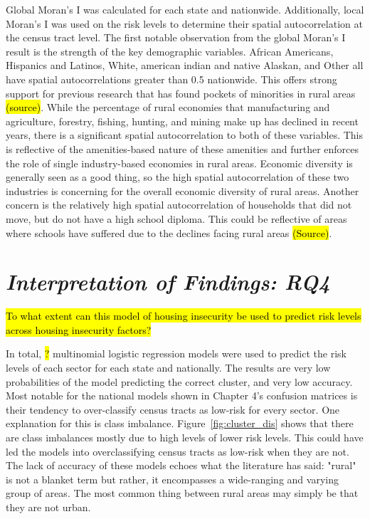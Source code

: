 Global Moran's I was calculated for each state and nationwide. Additionally, local Moran's I was used on the risk levels to determine their spatial autocorrelation at the census tract level. The first notable observation from the global Moran's I result is the strength of the key demographic variables. African Americans, Hispanics and Latinos, White, american indian and native Alaskan, and Other all have spatial autocorrelations greater than 0.5 nationwide. This offers strong support for previous research that has found pockets of minorities in rural areas \hl{(source)}.  While the percentage of rural economies that manufacturing and agriculture, forestry, fishing, hunting, and mining make up has declined in recent years, there is a significant spatial autocorrelation to both of these variables. This is reflective of the amenities-based nature of these amenities and further enforces the role of single industry-based economies in rural areas. Economic diversity is generally seen as a good thing, so the high spatial autocorrelation of these two industries is concerning for the overall economic diversity of rural areas. Another concern is the relatively high spatial autocorrelation of households that did not move, but do not have a high school diploma. This could be reflective of areas where schools have suffered due to the declines facing rural areas \hl{(Source)}. 



\section{\textit{Interpretation of Findings: RQ4}}
\hl{To what extent can this model of housing insecurity be used to predict risk levels across housing insecurity factors?}

In total, \hl{?} multinomial logistic regression models were used to predict the risk levels of each sector for each state and nationally. The results are very low probabilities of the model predicting the correct cluster, and very low accuracy. Most notable for the national models shown in Chapter 4's confusion matrices is their tendency to over-classify census tracts as low-risk for every sector. One explanation for this is class imbalance. Figure~\ref{fig:cluster_dis} shows that there are class imbalances mostly due to high levels of lower risk levels. This could have led the models into overclassifying census tracts as low-risk when they are not. The lack of accuracy of these models echoes what the literature has said: "rural" is not a blanket term but rather, it encompasses a wide-ranging and varying group of areas. The most common thing between rural areas may simply be that they are not urban. 

